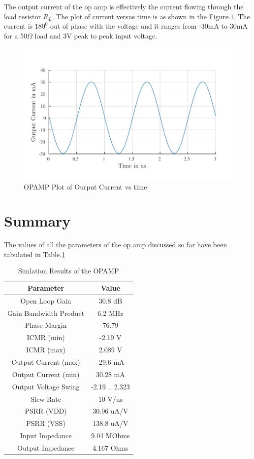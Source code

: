 The output current of the op amp is effectively the current flowing through the load resistor $R_L$. The plot of current versus time is as shown in the Figure.\ref{fig:OPAMP_Iout}. The current is $180^0$ out of phase with the voltage and it ranges from -30mA to 30mA for a 50$\Omega$ load and 3V peak to peak input voltage. 

\begin{figure} [H]
\centering
\includegraphics[scale=1]{Figures/Plots/OPAMP_Iout.pdf}
\caption{OPAMP Plot of Ourput Current vs time}
\label{fig:OPAMP_Iout}
\end{figure}

\section{Summary}

The values of all the parameters of the op amp discussed so far have been tabulated in Table.\ref{tab:OPAMP_Results}
\begin{table} [H]
\centering
\begin{tabular}{@{}cc@{}}
\toprule
Parameter					& Value				\\ \midrule
Open Loop Gain				& 30.8 dB			\\
Gain Bandwidth Product		& 6.2 MHz			\\
Phase Margin				& 76.79				\\
ICMR (min)					& -2.19 V			\\
ICMR (max)					& 2.089 V			\\
Output Current (max)		& -29.6 mA			\\
Output Current (min)		& 30.28 mA			\\
Output Voltage Swing		& -2.19 .. 2.323 	\\
Slew Rate					& 10 V/us			\\
PSRR (VDD)					& 30.96 uA/V		\\
PSRR (VSS)					& 138.8 uA/V		\\
Input Impedance				& 9.04 MOhms		\\
Output Impedance			& 4.167 Ohms		\\
\bottomrule
\end{tabular}
\caption{Simlation Results of the OPAMP}
\label{tab:OPAMP_Results}
\end{table}